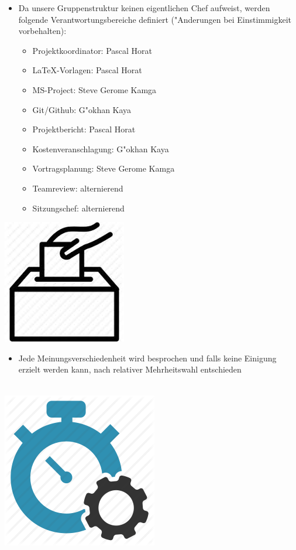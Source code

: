 \documentclass[12pt]{article}
\begin{document}
\begin{itemize}
\item Da unsere Gruppenstruktur keinen eigentlichen Chef aufweist, werden folgende Verantwortungsbereiche definiert ("Anderungen bei Einstimmigkeit vorbehalten):\\


\begin{itemize}
\item Projektkoordinator: Pascal Horat
\item LaTeX-Vorlagen: Pascal Horat
\item MS-Project: Steve Gerome Kamga
\item Git/Github: G"okhan Kaya  
\item Projektbericht: Pascal Horat
\item Kostenveranschlagung: G"okhan Kaya
\item Vortragsplanung: Steve Gerome Kamga
\item Teamreview: alternierend
\item Sitzungschef: alternierend
\end{itemize}
\end{itemize}


\begin{center}
\includegraphics[scale=0.3]{voteHand}\\
\end{center}

\begin{itemize}
\item Jede Meinungsverschiedenheit wird besprochen und falls keine Einigung erzielt werden kann, nach relativer Mehrheitswahl entschieden\\\\
\end{itemize}

\begin{center}
\includegraphics[scale=0.3]{performance}\\
\end{center}
\end{document}
